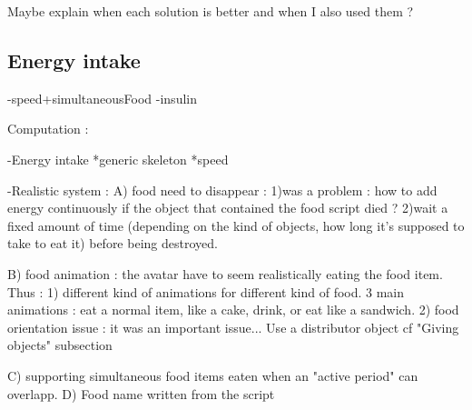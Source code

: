 Maybe explain when each solution is better and when I also used them ?


\subsection{Energy intake}
-speed+simultaneousFood
-insulin


Computation : 
 
-Energy intake
    *generic skeleton
    *speed
    
-Realistic system :
    A) food need to disappear : 
        1)was a problem : how to add energy continuously if the object that contained the food script died ? 
        2)wait a fixed amount of time (depending on the kind of objects, how long it's supposed to take to eat it) before being destroyed.
        
    B) food animation : the avatar have to seem realistically eating the food item. Thus :
        1) different kind of animations for different kind of food. 3 main animations : eat a normal item, like a cake, drink, or eat like a sandwich.
        2) food orientation issue : it was an important issue... Use a distributor object cf "Giving objects" subsection
    
    C) supporting simultaneous food items eaten when an "active period" can overlapp.
    D) Food name written from the script